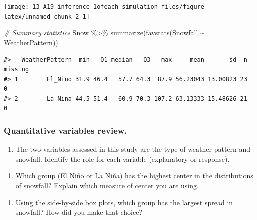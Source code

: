 \documentclass[
]{report}
\newenvironment{Shaded}{\begin{snugshade}}{\end{snugshade}}
\newcommand{\CommentTok}[1]{\textcolor[rgb]{0.56,0.35,0.01}{\textit{#1}}}
\newcommand{\FunctionTok}[1]{\textcolor[rgb]{0.00,0.00,0.00}{#1}}
\newcommand{\NormalTok}[1]{#1}
\newcommand{\SpecialCharTok}[1]{\textcolor[rgb]{0.00,0.00,0.00}{#1}}
\providecommand{\tightlist}{%
  \setlength{\itemsep}{0pt}\setlength{\parskip}{0pt}}
\newcommand\latexcode[1]{#1}
\begin{document}
\begin{center}\texttt{[image: 13-A19-inference-1ofeach-simulation\_files/figure-latex/unnamed-chunk-2-1]} \end{center}

\begin{Shaded}
\begin{Highlighting}[]
\CommentTok{\# Summary statistics}
\NormalTok{Snow }\SpecialCharTok{\%\textgreater{}\%} 
     \FunctionTok{summarize}\NormalTok{(}\FunctionTok{favstats}\NormalTok{(Snowfall }\SpecialCharTok{\textasciitilde{}}\NormalTok{ WeatherPattern))}
\end{Highlighting}
\end{Shaded}

\begin{verbatim}
#>   WeatherPattern  min   Q1 median   Q3   max     mean       sd  n missing
#> 1        El_Nino 31.9 46.4   57.7 64.3  87.9 56.23043 13.00823 23       0
#> 2        La_Nina 44.5 51.4   60.9 70.3 107.2 63.13333 15.48626 21       0
\end{verbatim}

\hypertarget{quantitative-variables-review.}{%
\subsubsection*{Quantitative variables review.}\label{quantitative-variables-review.}}

\begin{enumerate}
\def\labelenumi{\arabic{enumi}.}
\tightlist
\item
  The two variables assessed in this study are the type of weather pattern and snowfall. Identify the role for each variable (explanatory or response).
\end{enumerate}

\vspace{.6in}

\begin{enumerate}
\def\labelenumi{\arabic{enumi}.}
\setcounter{enumi}{1}
\tightlist
\item
  Which group (El Ni\latexcode{\~{n}}o or La Ni\latexcode{\~{n}}a) has the highest center in the distributions of snowfall? Explain which measure of center you are using.
\end{enumerate}

\vspace{.6in}

\begin{enumerate}
\def\labelenumi{\arabic{enumi}.}
\setcounter{enumi}{2}
\tightlist
\item
  Using the side-by-side box plots, which group has the largest spread in snowfall? How did you make that choice?
\end{enumerate}
\end{document}

